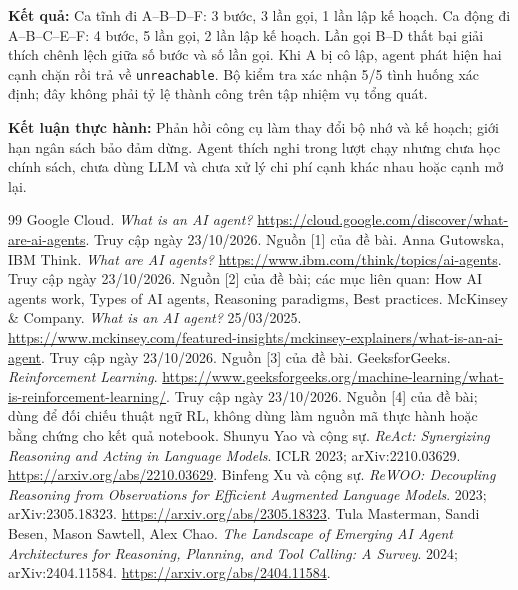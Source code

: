 \documentclass[12pt,a4paper]{article}
\begin{document}
\noindent\textbf{Kết quả:} Ca tĩnh đi A--B--D--F: 3 bước, 3 lần gọi, 1 lần lập kế hoạch.
Ca động đi A--B--C--E--F: 4 bước, 5 lần gọi, 2 lần lập kế hoạch.
Lần gọi B--D thất bại giải thích chênh lệch giữa số bước và số lần gọi. Khi A bị cô lập,
agent phát hiện hai cạnh chặn rồi trả về \texttt{unreachable}. Bộ kiểm tra xác nhận
5/5 tình huống xác định; đây không phải tỷ lệ thành công trên tập nhiệm vụ tổng quát.

\noindent\textbf{Kết luận thực hành:} Phản hồi công cụ làm thay đổi bộ nhớ và kế hoạch;
giới hạn ngân sách bảo đảm dừng. Agent thích nghi trong lượt chạy nhưng chưa học chính
sách, chưa dùng LLM và chưa xử lý chi phí cạnh khác nhau hoặc cạnh mở lại.



\newpage
{}
\begin{thebibliography}{99}
 Google Cloud. \emph{What is an AI agent?}
\url{https://cloud.google.com/discover/what-are-ai-agents}.
Truy cập ngày 23/10/2026. Nguồn [1] của đề bài.
 Anna Gutowska, IBM Think. \emph{What are AI agents?}
\url{https://www.ibm.com/think/topics/ai-agents}.
Truy cập ngày 23/10/2026. Nguồn [2] của đề bài; các mục liên quan:
How AI agents work, Types of AI agents, Reasoning paradigms, Best practices.
 McKinsey \& Company. \emph{What is an AI agent?}
25/03/2025.
\url{https://www.mckinsey.com/featured-insights/mckinsey-explainers/what-is-an-ai-agent}.
Truy cập ngày 23/10/2026. Nguồn [3] của đề bài.
 GeeksforGeeks. \emph{Reinforcement Learning}.
\url{https://www.geeksforgeeks.org/machine-learning/what-is-reinforcement-learning/}.
Truy cập ngày 23/10/2026. Nguồn [4] của đề bài; dùng để đối chiếu thuật ngữ RL,
không dùng làm nguồn mã thực hành hoặc bằng chứng cho kết quả notebook.
 Shunyu Yao và cộng sự. \emph{ReAct: Synergizing Reasoning and Acting
in Language Models}. ICLR 2023; arXiv:2210.03629.
\url{https://arxiv.org/abs/2210.03629}.
 Binfeng Xu và cộng sự. \emph{ReWOO: Decoupling Reasoning from
Observations for Efficient Augmented Language Models}. 2023; arXiv:2305.18323.
\url{https://arxiv.org/abs/2305.18323}.
 Tula Masterman, Sandi Besen, Mason Sawtell, Alex Chao.
\emph{The Landscape of Emerging AI Agent Architectures for Reasoning, Planning,
and Tool Calling: A Survey}. 2024; arXiv:2404.11584.
\url{https://arxiv.org/abs/2404.11584}.

\end{thebibliography}
\end{document}
